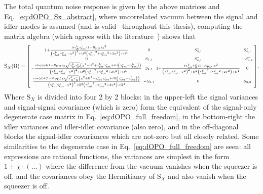 The total quantum noise response is given by the above matrices and Eq.~\ref{eq:dOPO_Sx_abstract}, where uncorrelated vacuum between the signal and idler modes is assumed (and is valid~\cite{} throughout this thesis), computing the matrix algebra (which agrees with the literature~\cite{}) shows that 
\begin{equation}\label{eq:nOPO_full_freedom}
\text{S}_X(\Omega)=\begin{bsmallmatrix}
1+\frac{8 \gamma^b_R {\gamma^c_\text{tot}} (1-R_\text{PD}) \chi ^2}{\left({\gamma^b_\text{tot}} {\gamma^c_\text{tot}}-\chi ^2\right)^2+\Omega ^2 \left({\gamma^b_\text{tot}}^2+{\gamma^c_\text{tot}}^2+2 \chi ^2\right)+\Omega ^4} & 0 & S_{3,1}^* & S_{4,1}^* \\
0 & S_{1,1} & S_{4,1}^* & -S_{3,1}^* \\
-\frac{\sin (\phi )4 (1-R_\text{PD}) \chi  \sqrt{\gamma^b_R \gamma^c_R}  \left(\chi ^2+\Omega^2+\gamma^b_\text{tot}\gamma^c_\text{tot}+i\Omega\left(\gamma^c_\text{tot}-\gamma^b_\text{tot}\right)\right)}{\left({\gamma^b_\text{tot}} {\gamma^c_\text{tot}}-\chi ^2\right)^2+\Omega ^2 \left({\gamma^b_\text{tot}}^2+{\gamma^c_\text{tot}}^2+2 \chi ^2\right)+\Omega ^4} & S_{4,1} & 1+\frac{8 {\gamma^b_\text{tot}} \gamma^c_R (1-R_\text{PD}) \chi ^2}{\left({\gamma^b_\text{tot}} {\gamma^c_\text{tot}}-\chi ^2\right)^2+\Omega ^2 \left({\gamma^b_\text{tot}}^2+{\gamma^c_\text{tot}}^2+2 \chi ^2\right)+\Omega ^4} & 0\\
\frac{\cos (\phi ) 4 (1-R_\text{PD}) \chi  \sqrt{\gamma^b_R \gamma^c_R} \left(\chi ^2+\Omega^2+\gamma^b_\text{tot}\gamma^c_\text{tot}+i\Omega\left(\gamma^c_\text{tot}-\gamma^b_\text{tot}\right)\right)}{\left({\gamma^b_\text{tot}} {\gamma^c_\text{tot}}-\chi ^2\right)^2+\Omega ^2 \left({\gamma^b_\text{tot}}^2+{\gamma^c_\text{tot}}^2+2 \chi ^2\right)+\Omega ^4} & -S_{3,1} & 0 & S_{3,3}
\end{bsmallmatrix}.\end{equation} 
Where $\text{S}_X$ is divided into four 2 by 2 blocks: in the upper-left the signal variances and signal-signal covariance (which is zero) form the equivalent of the signal-only degenerate case matrix in Eq.~\ref{eq:dOPO_full_freedom}, in the bottom-right the idler variances and idler-idler covariance (also zero), and in the off-diagonal blocks the signal-idler covariances which are not-zero but all closely related. Some similarities to the degenerate case in Eq.~\ref{eq:dOPO_full_freedom} are seen: all expressions are rational functions, the variances are simplest in the form $1+\chi \cdot(\ldots)$ where the difference from the vacuum vanishes when the squeezer is off, and the covariances obey the Hermitiancy of $\text{S}_X$ and also vanish when the squeezer is off. 


